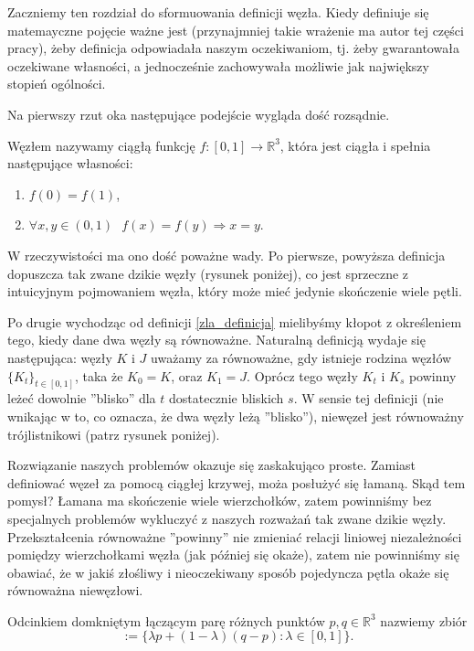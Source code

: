 Zaczniemy ten rozdział do sformuowania definicji węzła. Kiedy definiuje się matemayczne pojęcie ważne jest (przynajmniej takie wrażenie ma autor tej części pracy),
żeby definicja odpowiadała naszym oczekiwaniom, tj. żeby gwarantowała oczekiwane własności, a jednocześnie zachowywała możliwie jak największy
stopień ogólności.
 
Na pierwszy rzut oka następujące podejście wygląda dość rozsądnie.
 
 
\begin{definicja}
\label{zla_definicja}
 Węzłem nazywamy ciągłą funkcję $f\colon[0,1]\to\mathbb{R}^3$, która jest ciągła i spełnia następujące własności:
 \begin{enumerate}
  \item $f(0) = f(1)$,
  \item $\forall x,y\in(0,1) \ \ \ f(x) = f(y)\Rightarrow x = y$.
 \end{enumerate}
\end{definicja}
 
W rzeczywistości ma ono dość poważne wady.
Po pierwsze, powyższa definicja dopuszcza tak zwane dzikie węzły (rysunek poniżej), co jest sprzeczne z intuicyjnym pojmowaniem węzła, który może mieć
jedynie skończenie wiele pętli.
 
Po drugie wychodząc od definicji \ref{zla_definicja} mielibyśmy kłopot z określeniem tego, kiedy dane dwa węzły są równoważne. Naturalną definicją wydaje się
następująca: węzły $K$ i $J$ uważamy za równoważne, gdy istnieje rodzina węzłów $\lbrace K_t\rbrace_{t\in[0,1]}$, taka że $K_0 = K$, oraz $K_1 = J$. Oprócz tego
węzły $K_t$ i $K_s$ powinny leżeć dowolnie ''blisko'' dla $t$ dostatecznie bliskich $s$. W sensie tej definicji (nie wnikając w to, co oznacza,
że dwa węzły leżą ''blisko''), niewęzeł jest równoważny trójlistnikowi (patrz rysunek poniżej).
 
Rozwiązanie naszych problemów okazuje się zaskakująco proste. Zamiast definiować węzeł za pomocą ciągłej krzywej, moża posłużyć się łamaną. Skąd tem pomysł? Łamana ma skończenie wiele
wierzchołków, zatem powinniśmy bez specjalnych problemów wykluczyć z naszych rozważań tak zwane dzikie węzły. Przekształcenia równoważne ''powinny'' nie zmieniać relacji liniowej niezależności
pomiędzy wierzchołkami węzła (jak później się okaże), zatem nie powinniśmy się obawiać, że w jakiś złośliwy i nieoczekiwany sposób pojedyncza pętla okaże się równoważna niewęzłowi.
 
 
 
\begin{definicja}
 Odcinkiem domkniętym łączącym parę różnych punktów $p,q\in\mathbb{R}^3$ nazwiemy zbiór
 \begin{displaymath}
  [p,q] := \lbrace \lambda p + (1-\lambda)(q-p): \lambda\in[0,1]\rbrace.
 \end{displaymath}
\end{definicja}
 
